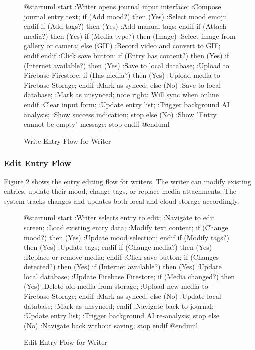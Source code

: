\begin{figure}[H]
\centering
\begin{plantuml}
@startuml
start
:Writer opens journal input interface;
:Compose journal entry text;
if (Add mood?) then (Yes)
  :Select mood emoji;
endif
if (Add tags?) then (Yes)
  :Add manual tags;
endif
if (Attach media?) then (Yes)
  if (Media type?) then (Image)
    :Select image from gallery or camera;
  else (GIF)
    :Record video and convert to GIF;
  endif
endif
:Click save button;
if (Entry has content?) then (Yes)
  if (Internet available?) then (Yes)
    :Save to local database;
    :Upload to Firebase Firestore;
    if (Has media?) then (Yes)
      :Upload media to Firebase Storage;
    endif
    :Mark as synced;
  else (No)
    :Save to local database;
    :Mark as unsynced;
    note right: Will sync when online
  endif
  :Clear input form;
  :Update entry list;
  :Trigger background AI analysis;
  :Show success indication;
  stop
else (No)
  :Show "Entry cannot be empty" message;
  stop
endif
@enduml
\end{plantuml}
\caption{Write Entry Flow for Writer}
\label{fig:write-entry-flow}
\end{figure}

\subsubsection{Edit Entry Flow}\label{subsubsec:editEntryFlow}

Figure \ref{fig:edit-entry-flow} shows the entry editing flow for writers. The writer can modify existing entries, update their mood, change tags, or replace media attachments. The system tracks changes and updates both local and cloud storage accordingly.

\begin{figure}[H]
\centering
\begin{plantuml}
@startuml
start
:Writer selects entry to edit;
:Navigate to edit screen;
:Load existing entry data;
:Modify text content;
if (Change mood?) then (Yes)
  :Update mood selection;
endif
if (Modify tags?) then (Yes)
  :Update tags;
endif
if (Change media?) then (Yes)
  :Replace or remove media;
endif
:Click save button;
if (Changes detected?) then (Yes)
  if (Internet available?) then (Yes)
    :Update local database;
    :Update Firebase Firestore;
    if (Media changed?) then (Yes)
      :Delete old media from storage;
      :Upload new media to Firebase Storage;
    endif
    :Mark as synced;
  else (No)
    :Update local database;
    :Mark as unsynced;
  endif
  :Navigate back to journal;
  :Update entry list;
  :Trigger background AI re-analysis;
  stop
else (No)
  :Navigate back without saving;
  stop
endif
@enduml
\end{plantuml}
\caption{Edit Entry Flow for Writer}
\label{fig:edit-entry-flow}
\end{figure}

